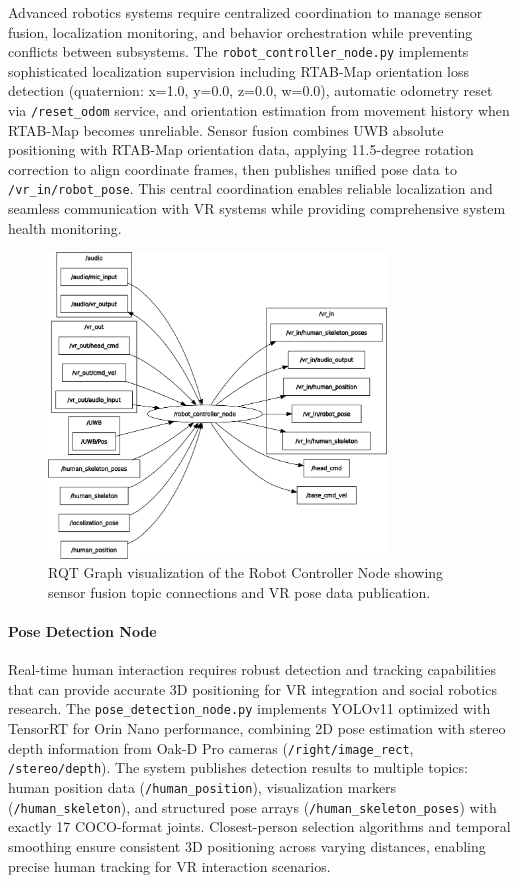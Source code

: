 Advanced robotics systems require centralized coordination to manage sensor fusion, localization monitoring, and behavior orchestration while preventing conflicts between subsystems. The \texttt{robot\_controller\_node.py} implements sophisticated localization supervision including RTAB-Map orientation loss detection (quaternion: x=1.0, y=0.0, z=0.0, w=0.0), automatic odometry reset via \texttt{/reset\_odom} service, and orientation estimation from movement history when RTAB-Map becomes unreliable. Sensor fusion combines UWB absolute positioning with RTAB-Map orientation data, applying 11.5-degree rotation correction to align coordinate frames, then publishes unified pose data to \texttt{/vr\_in/robot\_pose}. This central coordination enables reliable localization and seamless communication with VR systems while providing comprehensive system health monitoring.

\begin{figure}[H]
    \centering
    \includegraphics[width=0.8\textwidth]{Images/robotcontrollernode.png}
    \caption{RQT Graph visualization of the Robot Controller Node showing sensor fusion topic connections and VR pose data publication.}
    \label{fig:rqt_robot_controller_node}
\end{figure}

\paragraph{Pose Detection Node}

Real-time human interaction requires robust detection and tracking capabilities that can provide accurate 3D positioning for VR integration and social robotics research. The \texttt{pose\_detection\_node.py} implements YOLOv11 optimized with TensorRT for Orin Nano performance, combining 2D pose estimation with stereo depth information from Oak-D Pro cameras (\texttt{/right/image\_rect}, \texttt{/stereo/depth}). The system publishes detection results to multiple topics: human position data (\texttt{/human\_position}), visualization markers (\texttt{/human\_skeleton}), and structured pose arrays (\texttt{/human\_skeleton\_poses}) with exactly 17 COCO-format joints. Closest-person selection algorithms and temporal smoothing ensure consistent 3D positioning across varying distances, enabling precise human tracking for VR interaction scenarios.

